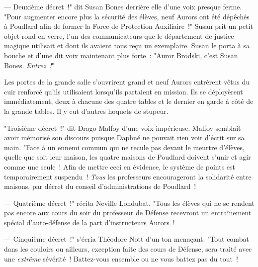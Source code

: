 --- Deuxième décret~!" dit Susan Bones derrière elle d'une voix presque ferme. "Pour augmenter encore plus la sécurité des élèves, neuf Aurors ont été dépêchés à Poudlard afin de former la Force de Protection Auxiliaire~!" Susan prit un petit objet rond en verre, l'un des communicateurs que le département de justice magique utilisait et dont ils avaient tous reçu un exemplaire. Susan le porta à sa bouche et d'une dit voix maintenant plus forte~: "Auror Brodski, c'est Susan Bones. \emph{Entrez~!}"

Les portes de la grande salle s'ouvrirent grand et neuf Aurors entrèrent vêtus du cuir renforcé qu'ils utilisaient lorsqu'ils partaient en mission. Ils se déployèrent immédiatement, deux à chacune des quatre tables et le dernier en garde à côté de la grande tables. Il y eut d'autres hoquets de stupeur.

"Troisième décret~!" dit Drago Malfoy d'une voix impérieuse. Malfoy semblait avoir mémorisé son discours puisque Daphné ne pouvait rien voir d'écrit sur sa main. "Face à un ennemi commun qui ne recule pas devant le meurtre d'élèves, quelle que soit leur maison, les quatre maisons de Poudlard doivent s'unir et agir comme une seule~! Afin de mettre ceci en évidence, le système de points est temporairement suspendu~! \emph{Tous} les professeurs encourageront la solidarité entre maisons, par décret du conseil d'administrations de Poudlard~!

--- Quatrième décret~!" récita Neville Londubat. "Tous les élèves qui ne se rendent pas encore aux cours du soir du professeur de Défense recevront un entraînement spécial d'auto-défense de la part d'instructeurs Aurors~!

--- Cinquième décret~!" s'écria Théodore Nott d'un ton menaçant. "Tout combat dans les couloirs ou ailleurs, exception faite des cours de Défense, sera traité avec une \emph{extrême} sévérité~! Battez-vous ensemble ou ne vous battez pas du tout~!

